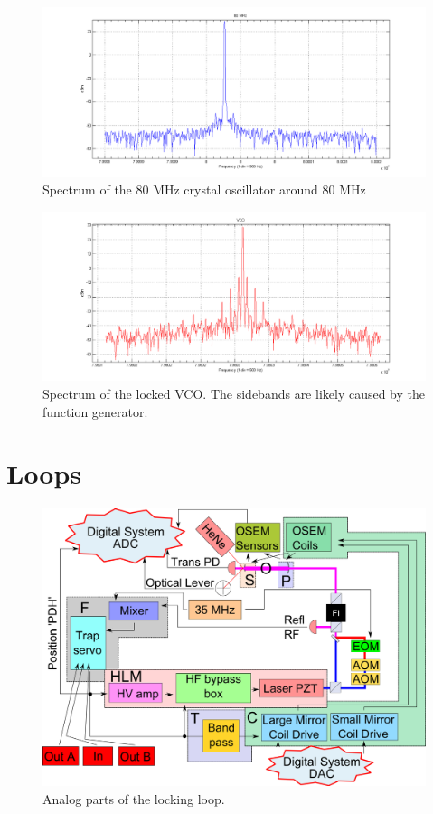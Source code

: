 \begin{figure}[htp]
	\centering
		\includegraphics[width=450pt]{figures/controls/80.png}
	\caption[80 MHz oscillator spectrum]{Spectrum of the 80 MHz crystal oscillator around 80 MHz}
	\label{fig:80}
\end{figure}

\begin{figure}[htp]
	\centering
		\includegraphics[width=450pt]{figures/controls/VCO.png}
	\caption[VCO spectrum]{Spectrum of the locked VCO. The sidebands are likely caused by the function generator.}
	\label{fig:VCO}
\end{figure}



\section{Loops}

\begin{figure}[htp]
\includegraphics[width=475pt,angle=270]{figures/controls/traplock.png}%
\caption{Analog parts of the locking loop.}%
\label{fig:traplock}%
\end{figure}

